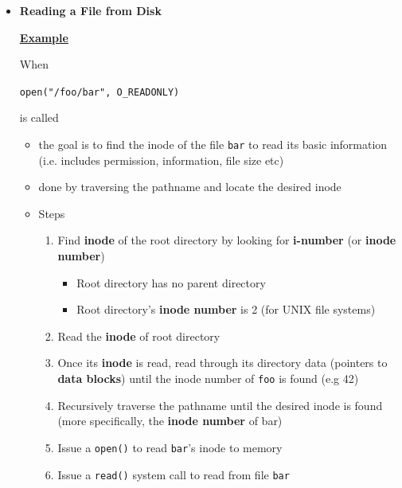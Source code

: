 \documentclass[12pt]{article}
\begin{document}
\begin{enumerate}[1.]
\begin{itemize}
        \item \textbf{Reading a File from Disk}

        \underline{\textbf{Example}}

        \bigskip

        When

        \bigskip

        \texttt{open("/foo/bar", O\_READONLY)}

        \bigskip

        is called

        \bigskip

        \begin{itemize}
            \item the goal is to find the inode of the file \texttt{bar} to read its basic information
            (i.e. includes permission, information, file size etc)
            \item done by traversing the pathname and locate the desired inode
            \item Steps

            \begin{enumerate}[1.]
                \item Find \textbf{inode} of the root directory by looking for \textbf{i-number} (or
                \textbf{inode number})
                \begin{itemize}
                    \item Root directory has no parent directory
                    \item Root directory's \textbf{inode number} is 2 (for UNIX file systems)
                \end{itemize}

                \item Read the \textbf{inode} of root directory
                \item Once its \textbf{inode} is read, read through its directory data (pointers to \textbf{data blocks})
                until the inode number of \texttt{foo} is found (e.g 42)
                \item Recursively traverse the pathname until the desired inode is found (more specifically, the \textbf{inode number} of bar)
                \item Issue a \texttt{open()} to read \texttt{bar}'s inode to memory
                \item Issue a \texttt{read()} system call to read from file \texttt{bar}


\end{enumerate}
\end{itemize}
\end{itemize}
\end{enumerate}
\end{document}
